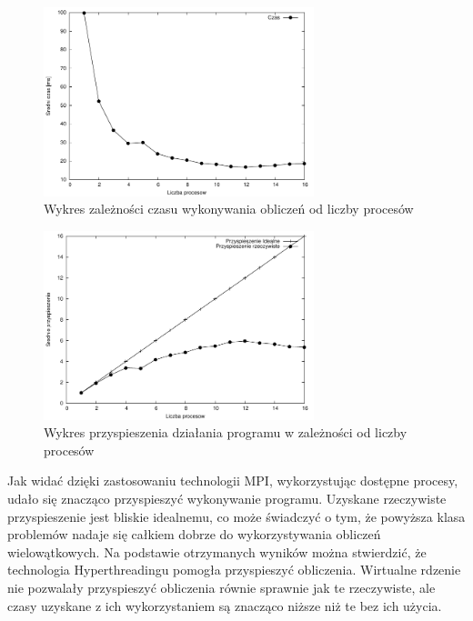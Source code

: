 \documentclass[a4paper,12pt]{article}
\begin{document}
\begin{figure}[!ht]
	\centering
  \includegraphics[width=0.7\textwidth]{wykresCzas.pdf}
  \caption{Wykres zależności czasu wykonywania obliczeń od liczby procesów}
\end{figure}

\begin{figure}[!ht]
	\centering
  \includegraphics[width=0.7\textwidth]{wykresPrzyspieszenie.pdf}
  \caption{Wykres przyspieszenia działania programu w zależności od liczby procesów}
\end{figure}


Jak widać dzięki zastosowaniu technologii MPI, wykorzystując dostępne procesy, udało się znacząco przyspieszyć wykonywanie programu. Uzyskane rzeczywiste przyspieszenie jest bliskie idealnemu, co może świadczyć o tym, że powyższa klasa problemów nadaje się całkiem dobrze do wykorzystywania obliczeń wielowątkowych.
Na podstawie otrzymanych wyników można stwierdzić, że technologia Hyperthreadingu pomogła przyspieszyć obliczenia. Wirtualne rdzenie nie pozwalały przyspieszyć obliczenia równie sprawnie jak te rzeczywiste, ale czasy uzyskane z ich wykorzystaniem są znacząco niższe niż te bez ich użycia.
\end{document}
